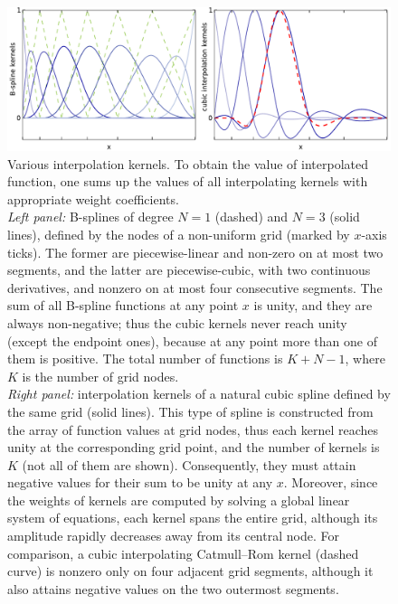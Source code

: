 \documentclass[12pt]{article}
\begin{document}
\begin{figure}
\begin{center}
\includegraphics[width=16cm]{SplineKernels.pdf}
\end{center}
\caption{Various interpolation kernels. To obtain the value of interpolated function, one sums up the values of all interpolating kernels with appropriate weight coefficients. \protect\\
\textit{Left panel:} B-splines of degree $N=1$ (dashed) and $N=3$ (solid lines), defined by the nodes of a non-uniform grid (marked by $x$-axis ticks). The former are piecewise-linear and non-zero on at most two segments, and the latter are piecewise-cubic, with two continuous derivatives, and nonzero on at most four consecutive segments. The sum of all B-spline functions at any point $x$ is unity, and they are always non-negative; thus the cubic kernels never reach unity (except the endpoint ones), because at any point more than one of them is positive.
The total number of functions is $K+N-1$, where $K$ is the number of grid nodes.\protect\\
\textit{Right panel:} interpolation kernels of a natural cubic spline defined by the same grid (solid lines). This type of spline is constructed from the array of function values at grid nodes, thus each kernel reaches unity at the corresponding grid point, and the number of kernels is $K$ (not all of them are shown). Consequently, they must attain negative values for their sum to be unity at any $x$. Moreover, since the weights of kernels are computed by solving a global linear system of equations, each kernel spans the entire grid, although its amplitude rapidly decreases away from its central node. For comparison, a cubic interpolating Catmull--Rom kernel (dashed curve) is nonzero only on four adjacent grid segments, although it also attains negative values on the two outermost segments. } \label{fig:SplineKernels}
\end{figure}

\end{document}
